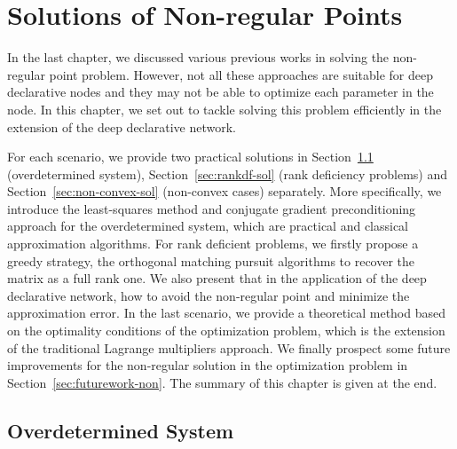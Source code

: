 \chapter{Solutions of Non-regular Points}
\label{cha:result}
In the last chapter, we discussed various previous works in solving the non-regular point problem. However, not all these approaches are suitable for deep declarative nodes and they may not be able to optimize each parameter in the node. In this chapter, we set out to tackle solving this problem efficiently in the extension of the deep declarative network. 
\par For each scenario, we provide two practical solutions in Section~\ref{sec:overdet-sol} (overdetermined system), Section~\ref{sec:rankdf-sol} (rank deficiency problems) and Section~\ref{sec:non-convex-sol} (non-convex cases) separately. More specifically, we introduce the least-squares method and conjugate gradient preconditioning approach for the overdetermined system, which are practical and classical approximation algorithms. For rank deficient problems, we firstly propose a greedy strategy, the orthogonal matching pursuit algorithms to recover the matrix as a full rank one. We also present that in the application of the deep declarative network, how to avoid the non-regular point and minimize the approximation error. In the last scenario, we provide a theoretical method based on the optimality conditions of the optimization problem, which is the extension of the traditional Lagrange multipliers approach. We finally prospect some future improvements for the non-regular solution in the optimization problem in Section~\ref{sec:futurework-non}. The summary of this chapter is given at the end. 

\section{Overdetermined System}
\label{sec:overdet-sol}
